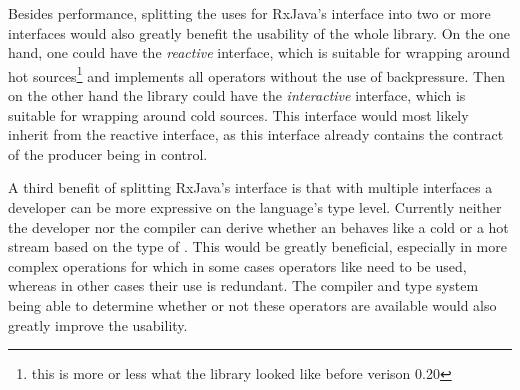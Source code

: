 Besides performance, splitting the uses for RxJava's \obs interface into two or more interfaces would also greatly benefit the usability of the whole library. On the one hand, one could have the \textit{reactive} \obs interface, which is suitable for wrapping around hot sources\footnote{this is more or less what the library looked like before verison 0.20} and implements all operators without the use of backpressure. Then on the other hand the library could have the \textit{interactive} \obs interface, which is suitable for wrapping around cold sources. This interface would most likely inherit from the reactive \obs interface, as this interface already contains the contract of the producer being in control.

A third benefit of splitting RxJava's \obs interface is that with multiple interfaces a developer can be more expressive on the language's type level. Currently neither the developer nor the compiler can derive whether an \obs behaves like a cold or a hot stream based on the type of \obs. This would be greatly beneficial, especially in more complex operations for which in some cases operators like  need to be used, whereas in other cases their use is redundant. The compiler and type system being able to determine whether or not these operators are available would also greatly improve the usability.